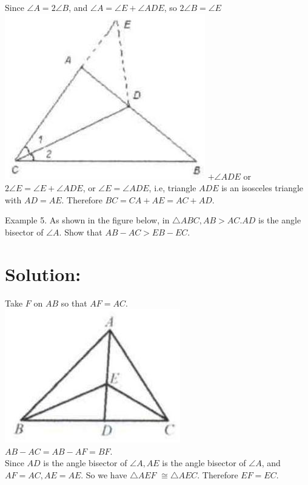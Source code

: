 \documentclass[10pt]{article}
\begin{document}
Since \(\angle A=2 \angle B\), and \(\angle A=\angle E+\angle A D E\), so \(2 \angle B=\angle E\)\\
\includegraphics[max width=\textwidth]{2025_04_17_97bc1f7e44d93c271a88g-057} \(+\angle A D E\) or \(2 \angle E=\angle E+\angle A D E\), or \(\angle E=\angle A D E\), i.e, triangle \(A D E\) is an isosceles triangle with \(A D=A E\). Therefore \(B C=C A+A E=A C+A D\).

Example 5. As shown in the figure below, in \(\triangle A B C, A B>A C . A D\) is the angle bisector of \(\angle A\). Show that \(A B-A C>E B-E C\).

\section*{Solution:}
Take \(F\) on \(A B\) so that \(A F=A C\).\\
\includegraphics[max width=\textwidth, center]{2025_04_17_97bc1f7e44d93c271a88g-057(2)}\\
\(A B-A C=A B-A F=B F\).\\
Since \(A D\) is the angle bisector of \(\angle A, A E\) is the angle bisector of \(\angle A\), and \(A F=A C, A E=A E\). So we have \(\triangle A E F\) \(\cong \triangle A E C\). Therefore \(E F=E C\).
\end{document}
